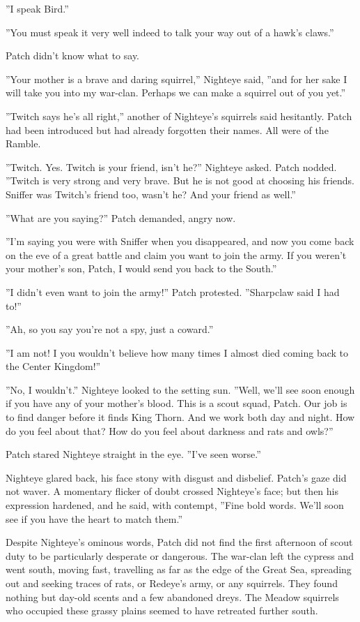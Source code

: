 \documentclass[12pt]{book}
\begin{document}
''I speak Bird.''

''You must speak it very well indeed to talk your way out of a hawk's claws.''

Patch didn't know what to say.

''Your mother is a brave and daring squirrel,'' Nighteye said, ''and for her sake I will take you into my war-clan. Perhaps we can make a squirrel out of you yet.''

''Twitch says he's all right,'' another of Nighteye's squirrels said hesitantly. Patch had been introduced but had already forgotten their names. All were of the Ramble.

''Twitch. Yes. Twitch is your friend, isn't he?'' Nighteye asked. Patch nodded. ''Twitch is very strong and very brave. But he is not good at choosing his friends. Sniffer was Twitch's friend too, wasn't he? And your friend as well.''

''What are you saying?'' Patch demanded, angry now.

''I'm saying you were with Sniffer when you disappeared, and now you come back on the eve of a great battle and claim you want to join the army. If you weren't your mother's son, Patch, I would send you back to the South.''

''I didn't even want to join the army!'' Patch protested. ''Sharpclaw said I had to!''

''Ah, so you say you're not a spy, just a coward.''

''I am not! I %
you wouldn't believe how many times I almost died coming back to the Center Kingdom!''

''No, I wouldn't.'' Nighteye looked to the setting sun. ''Well, we'll see soon enough if you have any of your mother's blood. This is a scout squad, Patch. Our job is to find danger before it finds King Thorn. And we work both day and night. How do you feel about that? How do you feel about darkness and rats and owls?''

Patch stared Nighteye straight in the eye. ''I've seen worse.''

Nighteye glared back, his face stony with disgust and disbelief. Patch's gaze did not waver. A momentary flicker of doubt crossed Nighteye's face; but then his expression hardened, and he said, with contempt, ''Fine bold words. We'll soon see if you have the heart to match them.''

Despite Nighteye's ominous words, Patch did not find the first afternoon of scout duty to be particularly desperate or dangerous. The war-clan left the cypress and went south, moving fast, travelling as far as the edge of the Great Sea, spreading out and seeking traces of rats, or Redeye's army, or any squirrels. They found nothing but day-old scents and a few abandoned dreys. The Meadow squirrels who occupied these grassy plains seemed to have retreated further south.
\end{document}
